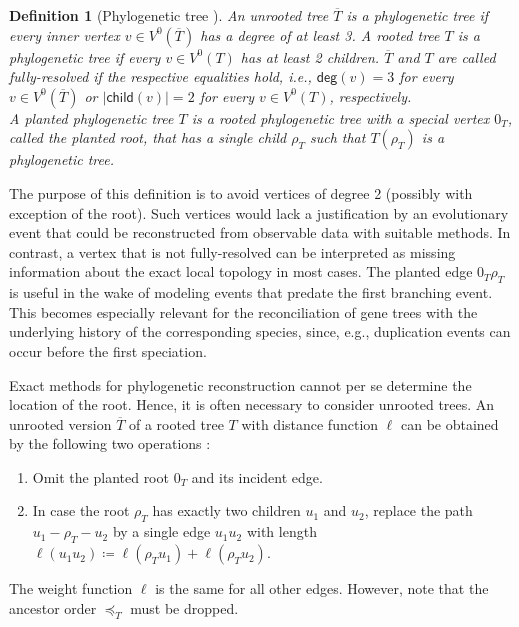 \documentclass[hidelinks,11pt]{scrreprt}
\newtheorem{definition}[theorem]{Definition}
\newcommand{\unrooted}[1]{\overline{#1}}
\newcommand{\child}{\mathsf{child}}
\newcommand{\degree}{\mathsf{deg}}
\begin{document}
\begin{definition}[Phylogenetic tree {\citep[cf.][]{hernandez-rosales2012,geiss2020c}}]
	An unrooted tree $\unrooted{T}$ is a \emph{phylogenetic tree} if every inner vertex $v \in V^0(\unrooted{T})$ has a degree of at least 3. A rooted tree $T$ is a \emph{phylogenetic tree} if every $v \in V^0(T)$ has at least 2 children.
	$\unrooted{T}$ and $T$ are called \emph{fully-resolved} if the respective equalities hold, i.e., $\degree(v)=3$ for every $v \in V^0(\unrooted{T})$ or $|\child(v)|=2$ for every $v \in V^0(T)$, respectively.\\
	A \emph{planted} phylogenetic tree $T$ is a rooted phylogenetic tree with a special vertex $0_T$, called the \emph{planted root}, that has a single child $\rho_T$ such that $T(\rho_T)$ is a phylogenetic tree.
\end{definition}

The purpose of this definition is to avoid vertices of degree 2 (possibly with exception of the root). Such vertices would lack a justification by an evolutionary event that could be reconstructed from observable data with suitable methods. In contrast, a vertex that is not fully-resolved can be interpreted as missing information about the exact local topology in most cases. The planted edge $0_T\rho_T$ is useful in the wake of modeling events that predate the first branching event. This becomes especially relevant for the reconciliation of gene trees with the underlying history of the corresponding species, since, e.g., duplication events can occur before the first speciation.

Exact methods for phylogenetic reconstruction cannot per se determine the location of the root. Hence, it is often necessary to consider unrooted trees. An unrooted version $\unrooted{T}$ of a rooted tree $T$ with distance function $\ell$ can be obtained by the following two operations \citep{stadler2020}:
\begin{enumerate}[label=(\roman*), itemsep=0.2cm, topsep=0.2cm, parsep=0cm]
	\item Omit the planted root $0_T$ and its incident edge.
	\item In case the root $\rho_T$ has exactly two children $u_1$ and $u_2$, replace the path \mbox{$u_1-\rho_T-u_2$} by a single edge $u_1u_2$ with length $\ell(u_1u_2) \coloneqq \ell(\rho_Tu_1) + \ell(\rho_Tu_2)$.
\end{enumerate}
The weight function $\ell$ is the same for all other edges. However, note that the ancestor order $\preceq_T$ must be dropped.
\end{document}
